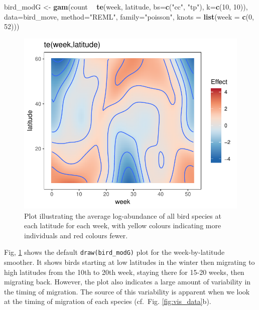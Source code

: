 \documentclass[12pt]{article}
\newenvironment{Shaded}{\begin{snugshade}}{\end{snugshade}}
\newcommand{\KeywordTok}[1]{\textcolor[rgb]{0.13,0.29,0.53}{\textbf{#1}}}
\newcommand{\DataTypeTok}[1]{\textcolor[rgb]{0.13,0.29,0.53}{#1}}
\newcommand{\DecValTok}[1]{\textcolor[rgb]{0.00,0.00,0.81}{#1}}
\newcommand{\StringTok}[1]{\textcolor[rgb]{0.31,0.60,0.02}{#1}}
\newcommand{\OperatorTok}[1]{\textcolor[rgb]{0.81,0.36,0.00}{\textbf{#1}}}
\newcommand{\NormalTok}[1]{#1}
\begin{document}
\begin{Shaded}
\begin{Highlighting}[]
\NormalTok{bird_modG <-}\StringTok{ }\KeywordTok{gam}\NormalTok{(count }\OperatorTok{~}\StringTok{ }\KeywordTok{te}\NormalTok{(week, latitude, }\DataTypeTok{bs=}\KeywordTok{c}\NormalTok{(}\StringTok{"cc"}\NormalTok{, }\StringTok{"tp"}\NormalTok{), }\DataTypeTok{k=}\KeywordTok{c}\NormalTok{(}\DecValTok{10}\NormalTok{, }\DecValTok{10}\NormalTok{)),}
                 \DataTypeTok{data=}\NormalTok{bird_move, }\DataTypeTok{method=}\StringTok{"REML"}\NormalTok{, }\DataTypeTok{family=}\StringTok{"poisson"}\NormalTok{,}
                 \DataTypeTok{knots =} \KeywordTok{list}\NormalTok{(}\DataTypeTok{week =} \KeywordTok{c}\NormalTok{(}\DecValTok{0}\NormalTok{, }\DecValTok{52}\NormalTok{)))}
\end{Highlighting}
\end{Shaded}

\begin{figure}
\centering
\includegraphics{../figures/bird_modG_plot-1.pdf}
\caption{\label{fig:bird_modG} Plot illustrating the average
log-abundance of all bird species at each latitude for each week, with
yellow colours indicating more individuals and red colours fewer.}
\end{figure}

Fig, \ref{fig:bird_modG} shows the default \texttt{draw(bird\_modG)}
plot for the week-by-latitude smoother. It shows birds starting at low
latitudes in the winter then migrating to high latitudes from the 10th
to 20th week, staying there for 15-20 weeks, then migrating back.
However, the plot also indicates a large amount of variability in the
timing of migration. The source of this variability is apparent when we
look at the timing of migration of each species (cf.~Fig.
\ref{fig:vis_data}b).
\end{document}
